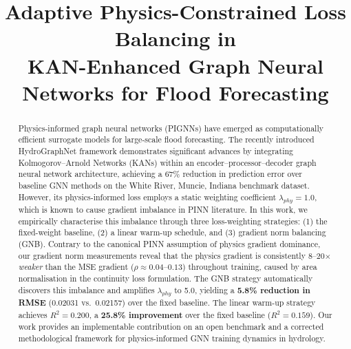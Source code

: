 \documentclass[conference]{IEEEtran}
\begin{document}
\title{Adaptive Physics-Constrained Loss Balancing in\\
KAN-Enhanced Graph Neural Networks for Flood Forecasting}

\author{
  \and
}

\maketitle

\begin{abstract}
Physics-informed graph neural networks (PIGNNs) have emerged as
computationally efficient surrogate models for large-scale flood
forecasting. The recently introduced HydroGraphNet framework
\cite{taghizadeh2025} demonstrates significant advances by integrating
Kolmogorov--Arnold Networks (KANs) within an encoder--processor--decoder
graph neural network architecture, achieving a 67\% reduction in
prediction error over baseline GNN methods on the White River, Muncie,
Indiana benchmark dataset. However, its physics-informed loss employs a
static weighting coefficient $\lambda_{phy}=1.0$, which is known to cause
gradient imbalance in PINN literature. In this work, we empirically
characterise this imbalance through three loss-weighting strategies: (1)
the fixed-weight baseline, (2) a linear warm-up schedule, and (3) gradient
norm balancing (GNB). Contrary to the canonical PINN assumption of physics
gradient dominance, our gradient norm measurements reveal that the physics
gradient is consistently 8--20$\times$ \emph{weaker} than the MSE gradient
($\rho \approx 0.04$--$0.13$) throughout training, caused by area
normalisation in the continuity loss formulation. The GNB strategy
automatically discovers this imbalance and amplifies $\lambda_{phy}$ to
5.0, yielding a \textbf{5.8\% reduction in RMSE} (0.02031 vs.\ 0.02157)
over the fixed baseline. The linear warm-up strategy achieves
$R^{2}=0.200$, a \textbf{25.8\% improvement} over the fixed baseline
($R^{2}=0.159$). Our work provides an implementable contribution on an open
benchmark and a corrected methodological framework for physics-informed GNN
training dynamics in hydrology.
\end{abstract}
\end{document}
